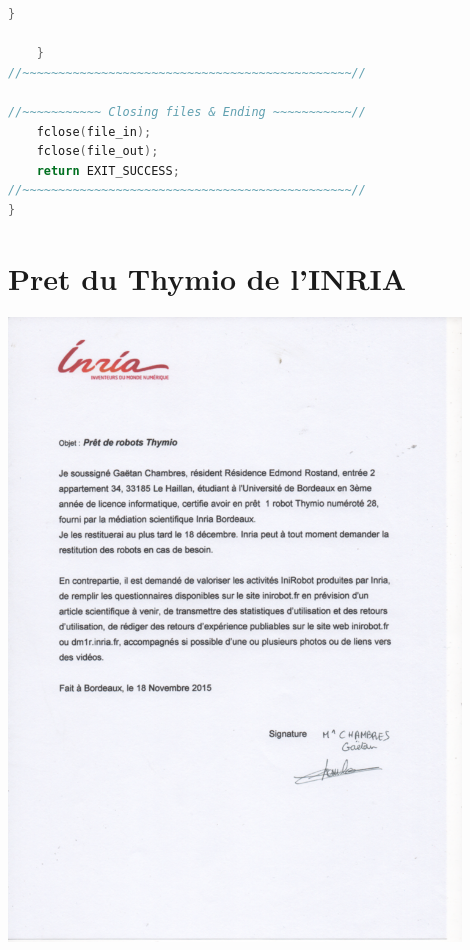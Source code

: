\documentclass[a4paper, 12pt]{report}
\begin{document}
\begin{lstlisting}[language=C]
		}
		
	}
//~~~~~~~~~~~~~~~~~~~~~~~~~~~~~~~~~~~~~~~~~~~~~~//

//~~~~~~~~~~~ Closing files & Ending ~~~~~~~~~~~//	
	fclose(file_in);
	fclose(file_out);
	return EXIT_SUCCESS;
//~~~~~~~~~~~~~~~~~~~~~~~~~~~~~~~~~~~~~~~~~~~~~~//
}
\end{lstlisting}
\chapter*{Pret du Thymio de l'INRIA}
\includegraphics[width=0.9\textwidth]{pret.png}
\end{document}
